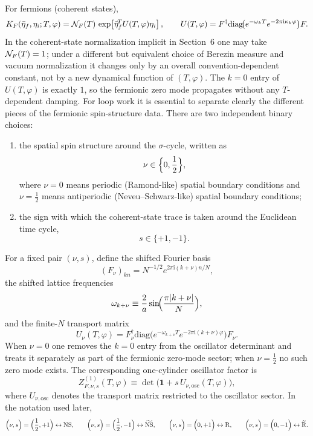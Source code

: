 \documentclass[11pt]{article}
\numberwithin{equation}{section}
\newcommand{\ii}{\mathrm{i}}
\begin{document}
For fermions (coherent states),
\begin{equation}
\label{eq:s7-003}
K_F(\bar\eta_f,\eta_i;T,\varphi)=
{\cal N}_F(T)\,
\exp\!\left[\bar\eta_f^{\!T}U(T,\varphi)\eta_i\right],\qquad
U(T,\varphi)=F^\dagger\mathrm{diag}\!\big(e^{-\omega_k T}e^{-2\pi \ii \kappa_k\varphi}\big)F.
\end{equation}
In the coherent-state normalization implicit in Section~6 one may take ${\cal N}_F(T)=1$; under a different but equivalent choice of Berezin measure and vacuum normalization it changes only by an overall convention-dependent constant, not by a new dynamical function of $(T,\varphi)$.
The $k=0$ entry of $U(T,\varphi)$ is exactly $1$, so the fermionic zero mode propagates without any $T$-dependent damping. For loop work it is essential to separate clearly the different pieces of the fermionic spin-structure data. There are two independent binary choices:
\begin{enumerate}
\item the spatial spin structure around the $\sigma$-cycle, written as
\[
\nu \in \Bigl\{0,\frac12\Bigr\},
\]
where $\nu=0$ means periodic (Ramond-like) spatial boundary conditions and $\nu=\frac12$ means antiperiodic (Neveu--Schwarz-like) spatial boundary conditions;
\item the sign with which the coherent-state trace is taken around the Euclidean time cycle,
\[
s\in\{+1,-1\}.
\]
\end{enumerate}
For a fixed pair $(\nu,s)$, define the shifted Fourier basis
\[
(F_\nu)_{kn}=N^{-1/2}e^{2\pi\ii(k+\nu)n/N},
\]
the shifted lattice frequencies
\[
\omega_{k+\nu}
\equiv
\frac{2}{a}\sin\!\Bigl(\frac{\pi|k+\nu|}{N}\Bigr),
\]
and the finite-$N$ transport matrix
\begin{equation}
\label{eq:s7-003b}
U_\nu(T,\varphi)
=
F_\nu^\dagger
\mathrm{diag}\!\bigl(
e^{-\omega_{k+\nu}T}e^{-2\pi\ii(k+\nu)\varphi}
\bigr)
F_\nu.
\end{equation}
When $\nu=0$ one removes the $k=0$ entry from the oscillator determinant and treats it separately as part of the fermionic zero-mode sector; when $\nu=\frac12$ no such zero mode exists. The corresponding one-cylinder oscillator factor is
\begin{equation}
\label{eq:s7-003c}
Z^{(1)}_{F,\nu,s}(T,\varphi)
\equiv
\det\!\bigl(\mathbf{1}+s\,U_{\nu,\mathrm{osc}}(T,\varphi)\bigr),
\end{equation}
where $U_{\nu,\mathrm{osc}}$ denotes the transport matrix restricted to the oscillator sector. In the notation used later,
\begin{equation}
\label{eq:s7-003d}
\Bigl(\nu,s\Bigr)=\Bigl(\frac12,+1\Bigr)\leftrightarrow \mathrm{NS},\qquad
\Bigl(\nu,s\Bigr)=\Bigl(\frac12,-1\Bigr)\leftrightarrow \widetilde{\mathrm{NS}},\qquad
\Bigl(\nu,s\Bigr)=\Bigl(0,+1\Bigr)\leftrightarrow \mathrm{R},\qquad
\Bigl(\nu,s\Bigr)=\Bigl(0,-1\Bigr)\leftrightarrow \widetilde{\mathrm{R}}.
\end{equation}
\end{document}
